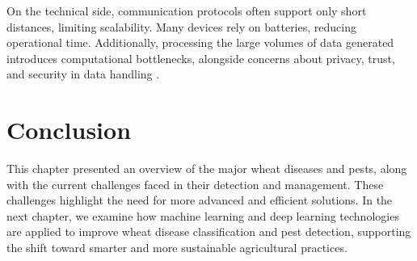 On the technical side, communication protocols often support only short distances, limiting scalability. Many devices rely on batteries, reducing operational time. Additionally, processing the large volumes of data generated introduces computational bottlenecks, alongside concerns about privacy, trust, and security in data handling \parencite{idoje2021survey}.



\section{Conclusion}

This chapter presented an overview of the major wheat diseases and pests, along with the current challenges faced in their detection and management. These challenges highlight the need for more advanced and efficient solutions. In the next chapter, we examine how machine learning and deep learning technologies are applied to improve wheat disease classification and pest detection, supporting the shift toward smarter and more sustainable agricultural practices.




